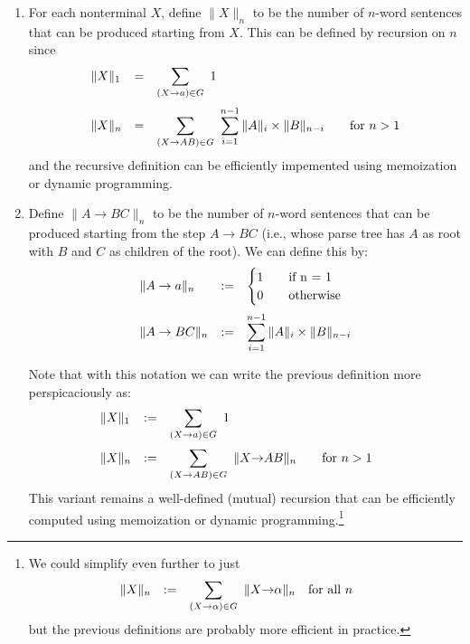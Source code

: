 \documentclass[10pt]{article}
\begin{document}
\begin{enumerate}
    \item For each nonterminal $X$, define $\|X\|_n$ to be the number of $n$-word sentences that can be produced starting from $X$. This can be defined by recursion on $n$ since
    \[
        \begin{array}{lcl@{\qquad}l}
        \|X\|_1 &=& \displaystyle\sum_{(X{\to} a)\in G}\  1\\
        \noalign{\medskip}
        \|X\|_n &=& \displaystyle\sum_{(X{\to} AB)\in G}\  \sum_{i=1}^{n-1}\|A\|_i\times\|B\|_{n-i}&\mbox{for $n>1$}\\
        \end{array}
    \]
    and the recursive definition can be efficiently impemented using memoization or dynamic programming.

    \item Define $\|A\to BC\|_n$ to be the number of $n$-word sentences that can be produced starting from the step $A\to BC$ (i.e., whose parse tree has $A$ as root with $B$ and $C$ as children of the root). We can define this by:
    \[
        \begin{array}{lcl}
        \|A\to a\|_n &:=& \begin{cases}
                            1 &\quad\mbox{if n = 1}\\
                            0 &\quad\mbox{otherwise}\\
                          \end{cases}\\
        \noalign{\medskip}
        \|A\to BC\|_n &:=& \displaystyle\sum_{i=1}^{n-1}\|A\|_i\times\|B\|_{n-i}
    \end{array}
    \]

    Note that with this notation we can write the previous definition more perspicaciously as:
    \[
        \begin{array}{lcl@{\qquad}l}
        \|X\|_1 &:=& \displaystyle\sum_{(X{\to} a)\in G}\  1\\
        \noalign{\medskip}
        \|X\|_n &:=& \displaystyle\sum_{(X{\to} AB)\in G}\  \|X{\to}AB\|_n\qquad\mbox{for $n>1$}\\
        \end{array}
    \]
    This variant remains a well-defined (mutual) recursion that can be efficiently computed using memoization or dynamic programming.\footnote{
    We could simplify even further to just
    \[
        \begin{array}{lcl@{\qquad}l}
        \|X\|_n &:=& \displaystyle\sum_{(X{\to} \alpha)\in G}\  \|X{\to}\alpha\|_n\quad\mbox{for all $n$}\\
        \end{array}
    \]
    but the previous definitions are probably more efficient in practice.}


\end{enumerate}
\end{document}

